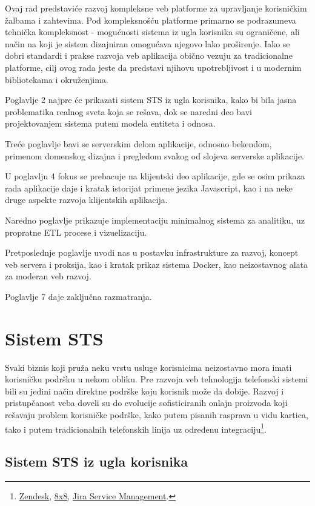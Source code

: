 \documentclass[12pt,oneside]{memoir}
\begin{document}
Ovaj rad predstaviće razvoj kompleksne veb platforme za upravljanje korisničkim žalbama i zahtevima. Pod kompleksnošću platforme primarno se podrazumeva tehnička kompleksnost - mogućnosti sistema iz ugla korisnika su ograničene, ali način na koji je sistem dizajniran omogućava njegovo lako proširenje. Iako se dobri standardi i prakse razvoja veb aplikacija obično vezuju za tradicionalne platforme, cilj ovog rada jeste da predstavi njihovu upotrebljivost i u modernim bibliotekama i okruženjima.

Poglavlje 2 najpre će prikazati sistem STS iz ugla korisnika, kako bi bila jasna problematika realnog sveta koja se rešava, dok se naredni deo bavi projektovanjem sistema putem modela entiteta i odnosa. 

Treće poglavlje bavi se serverskim delom aplikacije, odnosno bekendom, primenom domenskog dizajna i pregledom svakog od slojeva serverske aplikacije.

U poglavlju 4 fokus se prebacuje na klijentski deo aplikacije, gde se osim prikaza rada aplikacije daje i kratak istorijat primene jezika Javascript, kao i na neke druge aspekte razvoja klijentskih aplikacija.

Naredno poglavlje prikazuje implementaciju minimalnog sistema za analitiku, uz propratne ETL procese i vizuelizaciju.

Pretposlednje poglavlje uvodi nas u postavku infrastrukture za razvoj, koncept veb servera i proksija, kao i kratak prikaz sistema Docker, kao neizostavnog alata za moderan veb razvoj.

Poglavlje 7 daje zaključna razmatranja.

\chapter{Sistem STS}
Svaki biznis koji pruža neku vrstu usluge korisnicima neizostavno mora imati korisničku podršku u nekom obliku. Pre razvoja veb tehnologija telefonski sistemi bili su jedini način direktne podrške koju korisnik može da dobije. Razvoj i pristupčanost veba doveli su do evolucije sofisticiranih onlajn proizvoda koji rešavaju problem korisničke podrške, kako putem pisanih rasprava u vidu kartica, tako i putem tradicionalnih telefonskih linija uz određenu integraciju\footnote{\href{http://zendesk.com}{Zendesk}, \href{https://www.8x8.com/}{8x8}, \href{https://www.atlassian.com/software/jira/service-management}{Jira Service Management}.}.


\section{Sistem STS iz ugla korisnika}
\end{document}
